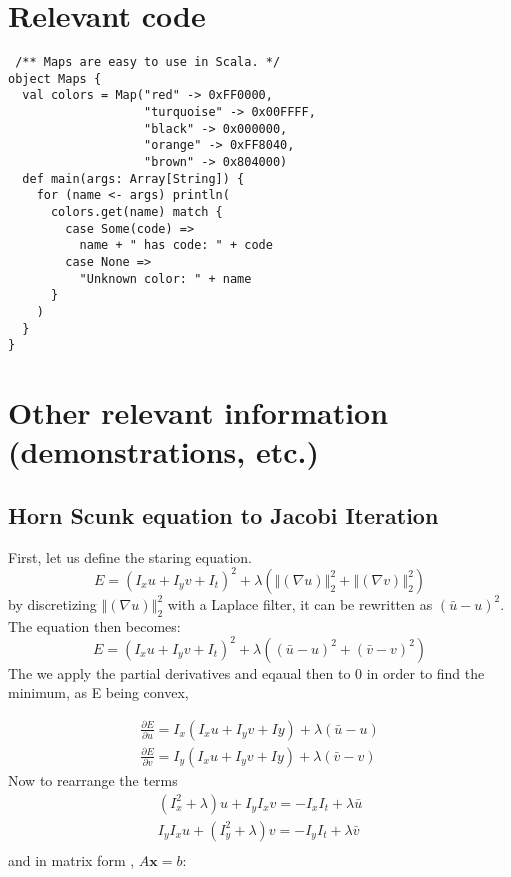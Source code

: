 \appendix
\chapter{Relevant code}

\begin{verbatim}
 /** Maps are easy to use in Scala. */
object Maps {
  val colors = Map("red" -> 0xFF0000,
                   "turquoise" -> 0x00FFFF,
                   "black" -> 0x000000,
                   "orange" -> 0xFF8040,
                   "brown" -> 0x804000)
  def main(args: Array[String]) {
    for (name <- args) println(
      colors.get(name) match {
        case Some(code) =>
          name + " has code: " + code
        case None =>
          "Unknown color: " + name
      }
    )
  }
}
\end{verbatim}

\chapter{Other relevant information (demonstrations, etc.)}
\section{Horn Scunk equation to Jacobi Iteration} \label{GSDemo}
First, let us define the staring equation.
\begin{equation}
	E = (I_xu+ I_yv + I_t)^2 + \lambda(\left\Vert(\nabla u) \right\Vert_2^2 +\left\Vert(\nabla v)\right\Vert_2^2)
\end{equation}
by discretizing $\left\Vert(\nabla u) \right\Vert_2^2$ with a Laplace filter, it can be rewritten as $(\bar{u}-u)^2$. The equation then becomes:
\begin{equation}
E = (I_xu+ I_yv + I_t)^2 + \lambda((\bar{u}-u)^2+(\bar{v}-v)^2)
\end{equation}
The we apply the partial derivatives and eqaual then to 0 in order to find the minimum, as E being convex,

\begin{equation} 
\begin{split} 
\frac{\partial E}{\partial u} = I_x(I_xu+I_yv+Iy) + \lambda(\bar{u}-u) \\
\frac{\partial E}{\partial v} = I_y(I_xu+I_yv+Iy) + \lambda(\bar{v}-v)
\end{split}
\end{equation}
Now to rearrange the  terms
\begin{equation} 
\begin{split} 
(I_x^2+\lambda)u + I_y I_x v  =  -I_xI_t + \lambda \bar{u} \\
I_y I_x u+(I_y^2+\lambda)v  = -I_yI_t + \lambda \bar{v} \\
\end{split}
\end{equation}
and in matrix form , $A \boldsymbol{x} = b$:

